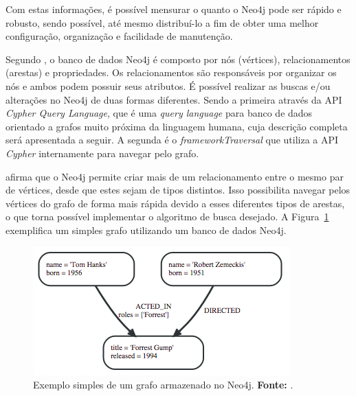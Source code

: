 
\par Com estas informações, é possível mensurar o quanto o Neo4j pode ser rápido e robusto, sendo possível, até mesmo distribuí-lo a fim de obter uma melhor configuração, organização e facilidade de manutenção.

\par Segundo , o banco de dados Neo4j é composto por nós (vértices), relacionamentos (arestas) e propriedades. Os relacionamentos são responsáveis por organizar os nós e ambos podem possuir seus atributos. É possível realizar as buscas e/ou alterações no Neo4j de duas formas diferentes. Sendo a primeira através da API \textit{Cypher Query Language}, que é uma \textit{query language} para banco de dados orientado a grafos muito próxima da linguagem humana, cuja descrição completa será apresentada a seguir. A segunda é o \textit{framework\footnotemark[12] Traversal} que utiliza a API \textit{Cypher} internamente para navegar pelo grafo.



 afirma que o Neo4j permite criar mais de um relacionamento entre o mesmo par de vértices, desde que estes sejam de tipos distintos. Isso possibilita navegar pelos vértices do grafo de forma mais rápida devido a esses diferentes tipos de arestas, o que torna possível implementar o algoritmo de busca desejado. A Figura~\ref{fig:grafo_simples_neo4j} exemplifica um simples grafo utilizando um banco de dados Neo4j.


\begin{figure}[h!]
	\centerline{\includegraphics[scale=0.8]{./imagens/simple_graph_neo4j.png}}
	\caption[Exemplo simples de um grafo armazenado no Neo4j]
	{Exemplo simples de um grafo armazenado no Neo4j. \textbf{Fonte:} .}
	\label{fig:grafo_simples_neo4j}
\end{figure}

